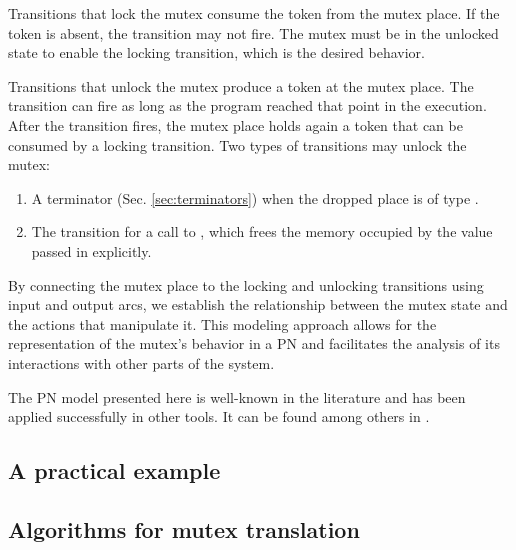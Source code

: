 Transitions that lock the mutex consume the token from the mutex place.
If the token is absent, the transition may not fire.
The mutex must be in the unlocked state to enable the locking transition,
which is the desired behavior.

Transitions that unlock the mutex produce a token at the mutex place.
The transition can fire as long as the program reached that point in the execution.
After the transition fires, the mutex place holds again a token
that can be consumed by a locking transition.
Two types of transitions may unlock the mutex:

\begin{enumerate}
  \item A  terminator (Sec. \ref{sec:terminators})
        when the dropped place is of type .
  \item The transition for a call to ,
        which frees the memory occupied by the value passed in explicitly.
\end{enumerate}

By connecting the mutex place
to the locking and unlocking transitions using input and output arcs,
we establish the relationship between the mutex state and the actions that manipulate it.
This modeling approach allows for the representation of the mutex's behavior in a \acrshort{PN}
and facilitates the analysis of its interactions with other parts of the system.

The \acrshort{PN} model presented here is well-known in the literature
and has been applied successfully in other tools.
It can be found among others in \cite{kavi2002modeling,moshtaghi2001,meyer2020,zhang2022deadlocks}.

\subsection{A practical example}

\subsection{Algorithms for mutex translation}
\label{sec:mutex-algorithms}